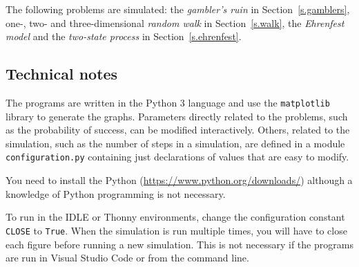 The following problems are simulated: the \emph{gambler's ruin} in 
Section~\ref{s.gamblers}, one-, two- and three-dimensional \emph{random walk} in Section~\ref{s.walk}, the \emph{Ehrenfest model} and the \emph{two-state process} in Section~\ref{s.ehrenfest}.

\subsection*{Technical notes}

The programs are written in the Python 3 language and use the \verb+matplotlib+ library to generate the graphs. Parameters directly related to the problems, such as the probability of success, can be modified interactively. Others, related to the simulation, such as the number of steps in a simulation, are defined in a module \verb+configuration.py+ containing just declarations of values that are easy to modify.

You need to install the Python (\url{https://www.python.org/downloads/}) although a knowledge of Python programming is not necessary.

To run in the IDLE or Thonny environments, change the configuration constant \verb+CLOSE+ to \verb+True+. When the simulation is run multiple times, you will have to close each figure before running a new simulation. This is not necessary if the programs are run in Visual Studio Code or from the command line.
